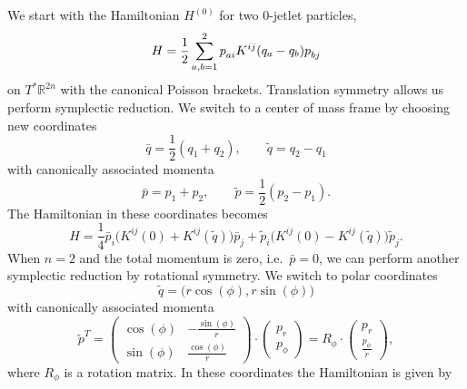 \documentclass[12pt]{amsart}
\newcommand{\R}{\ensuremath{\mathbb{R}}}
\begin{document}
We start with the Hamiltonian $H^{(0)}$ for two $0$-jetlet particles,
\begin{equation*}\label{eq:H-two-0jetlets}
  H = \frac{1}{2} \sum_{a,b=1}^2 p\indices{_a_i} K^{ij}(q_a - q_b) p\indices{_b_j}
\end{equation*}
on $T^* \R^{2n}$ with the canonical Poisson brackets.
Translation symmetry allows us perform symplectic reduction. We switch
to a center of mass frame by choosing new coordinates
\begin{equation}\label{eq:CoM-coords}
  \bar{q} = \frac{1}{2}(q_1 + q_2), \qquad \tilde{q} = q_2 - q_1
\end{equation}
with canonically associated momenta
\begin{equation*}
  \bar{p} = p_1 + p_2, \qquad \tilde{p} = \frac{1}{2}(p_2 - p_1).
\end{equation*}
The Hamiltonian in these coordinates becomes
\begin{equation*}
  H = \frac{1}{4} \bar{p}_i \big( K^{ij}(0) + K^{ij}(\tilde{q}) \big)   \bar{p}_j
              + \tilde{p}_i \big( K^{ij}(0) - K^{ij}(\tilde{q}) \big) \tilde{p}_j.
\end{equation*}
When $n = 2$ and the total momentum is zero, i.e.~$\bar{p} = 0$, we can perform
another symplectic reduction by rotational symmetry. We switch to
polar coordinates
\begin{equation}\label{eq:polar-coords}
  \tilde{q} = \big(r\cos(\phi),r\sin(\phi)\big)
\end{equation}
with canonically associated momenta
\begin{equation*}
  \tilde{p}^T =
  \begin{pmatrix}
    \cos(\phi) & -\frac{\sin(\phi)}{r} \\
    \sin(\phi) &  \frac{\cos(\phi)}{r}
  \end{pmatrix} \cdot
  \begin{pmatrix}
    p_r \\
    p_\phi
  \end{pmatrix}
  = R_\phi \cdot
  \begin{pmatrix}
    p_r \\
    \frac{p_\phi}{r}
  \end{pmatrix},
\end{equation*}
where $R_\phi$ is a rotation matrix. In these coordinates the
Hamiltonian is given by
\end{document}

